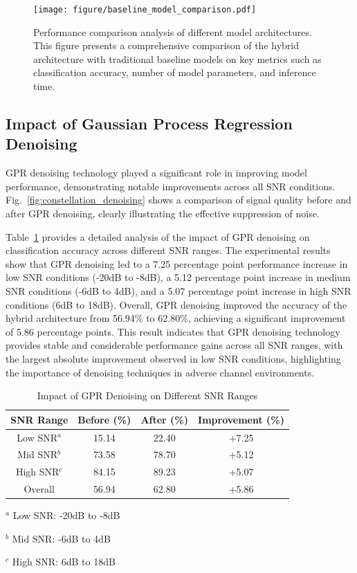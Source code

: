 \documentclass[conference]{IEEEtran}
\begin{document}
\begin{figure}[htbp]
\centering
\texttt{[image: figure/baseline\_model\_comparison.pdf]}
\caption{Performance comparison analysis of different model architectures. This figure presents a comprehensive comparison of the hybrid architecture with traditional baseline models on key metrics such as classification accuracy, number of model parameters, and inference time.}
\label{fig:model_comparison}
\end{figure}

\subsection{Impact of Gaussian Process Regression Denoising}
GPR denoising technology played a significant role in improving model performance, demonstrating notable improvements across all SNR conditions. Fig.~\ref{fig:constellation_denoising} shows a comparison of signal quality before and after GPR denoising, clearly illustrating the effective suppression of noise.

Table~\ref{tab:gpr_impact} provides a detailed analysis of the impact of GPR denoising on classification accuracy across different SNR ranges. The experimental results show that GPR denoising led to a 7.25 percentage point performance increase in low SNR conditions (-20dB to -8dB), a 5.12 percentage point increase in medium SNR conditions (-6dB to 4dB), and a 5.07 percentage point increase in high SNR conditions (6dB to 18dB). Overall, GPR denoising improved the accuracy of the hybrid architecture from 56.94\% to 62.80\%, achieving a significant improvement of 5.86 percentage points. This result indicates that GPR denoising technology provides stable and considerable performance gains across all SNR ranges, with the largest absolute improvement observed in low SNR conditions, highlighting the importance of denoising techniques in adverse channel environments.

\begin{table}[!htbp]
\centering
\caption{Impact of GPR Denoising on Different SNR Ranges}
\label{tab:gpr_impact}
\begin{threeparttable}
\begin{tabular}{@{}cccc@{}}
\toprule
SNR Range & Before (\%) & After (\%) & Improvement (\%) \\
\midrule
Low SNR$^{a}$ & 15.14 & 22.40 & +7.25 \\
Mid SNR$^{b}$ & 73.58 & 78.70 & +5.12 \\
High SNR$^{c}$ & 84.15 & 89.23 & +5.07 \\
Overall & 56.94 & 62.80 & +5.86 \\
\bottomrule
\end{tabular}
\begin{tablenotes}
\footnotesize
\item[$^{a}$] Low SNR: -20dB to -8dB
\item[$^{b}$] Mid SNR: -6dB to 4dB  
\item[$^{c}$] High SNR: 6dB to 18dB
\end{tablenotes}
\end{threeparttable}
\end{table}
\end{document}

